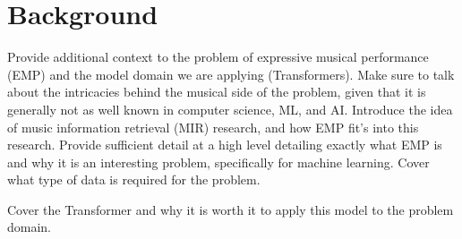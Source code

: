 \chapter{Background}\label{ch:ch2}
Provide additional context to the problem of expressive musical performance (EMP) and the model domain we are applying (Transformers). Make sure to talk about the intricacies behind the musical side of the problem, given that it is generally not as well known in computer science, ML, and AI. Introduce the idea of music information retrieval (MIR) research, and how EMP fit's into this research. Provide sufficient detail at a high level detailing exactly what EMP is and why it is an interesting problem, specifically for machine learning. Cover what type of data is required for the problem.

Cover the Transformer and why it is worth it to apply this model to the problem domain. 


